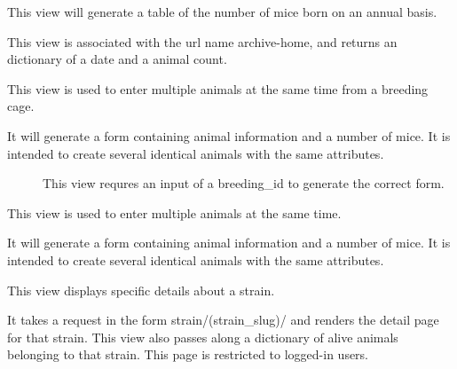 \documentclass[letterpaper,10pt,english]{sphinxmanual}
\begin{document}

\begin{fulllineitems}
\label{api:animal.views.date_archive_year}
This view will generate a table of the number of mice born on an annual basis.

This view is associated with the url name archive-home, and returns an dictionary of a date and a animal count.

\end{fulllineitems}



\begin{fulllineitems}
\label{api:animal.views.multiple_breeding_pups}
This view is used to enter multiple animals at the same time from a breeding cage.
\begin{description}
\item[{It will generate a form containing animal information and a number of mice.  It is intended to create several identical animals with the same attributes.}] \leavevmode
This view requres an input of a breeding\_id to generate the correct form.

\end{description}

\end{fulllineitems}



\begin{fulllineitems}
\label{api:animal.views.multiple_pups}
This view is used to enter multiple animals at the same time.

It will generate a form containing animal information and a number of mice.  It is intended to create several identical animals with the same attributes.

\end{fulllineitems}



\begin{fulllineitems}
\label{api:animal.views.strain_detail}
This view displays specific details about a strain.

It takes a request in the form strain/(strain\_slug)/ and renders the detail page for that strain.
This view also passes along a dictionary of alive animals belonging to that strain.
This page is restricted to logged-in users.

\end{fulllineitems}
\end{document}
